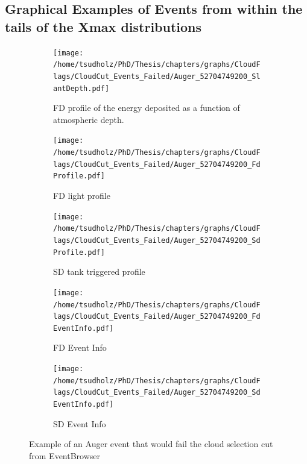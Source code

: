 \subsection{Graphical Examples of Events from within the tails of the Xmax distributions}


\begin{figure}[!p]
\centering
 \vspace{2cm}
  \begin{subfigure}[b]{\textwidth}
  \centering
  \texttt{[image: /home/tsudholz/PhD/Thesis/chapters/graphs/CloudFlags/CloudCut\_Events\_Failed/Auger\_52704749200\_SlantDepth.pdf]}
  \caption{FD profile of the energy deposited as a function of atmospheric depth.}
  \end{subfigure}
 \vspace{0.5cm}
  \begin{subfigure}[b]{0.45\textwidth}
  	\centering
  	\texttt{[image: /home/tsudholz/PhD/Thesis/chapters/graphs/CloudFlags/CloudCut\_Events\_Failed/Auger\_52704749200\_FdProfile.pdf]}
  	\caption{FD light profile}
  \end{subfigure}
  \begin{subfigure}[b]{0.45\textwidth}
  	\centering
  	\texttt{[image: /home/tsudholz/PhD/Thesis/chapters/graphs/CloudFlags/CloudCut\_Events\_Failed/Auger\_52704749200\_SdProfile.pdf]}
  	\caption{SD tank triggered profile}
  \end{subfigure}

  \begin{subfigure}[b]{0.45\textwidth}
  	\centering
	\texttt{[image: /home/tsudholz/PhD/Thesis/chapters/graphs/CloudFlags/CloudCut\_Events\_Failed/Auger\_52704749200\_FdEventInfo.pdf]}
  	\caption{FD Event Info}
  \end{subfigure}
  \begin{subfigure}[b]{0.45\textwidth}
  	\centering
	\texttt{[image: /home/tsudholz/PhD/Thesis/chapters/graphs/CloudFlags/CloudCut\_Events\_Failed/Auger\_52704749200\_SdEventInfo.pdf]}
  	\caption{SD Event Info}
  \end{subfigure}
  \caption{Example of an Auger event that would fail the cloud selection cut from EventBrowser}
\end{figure}

